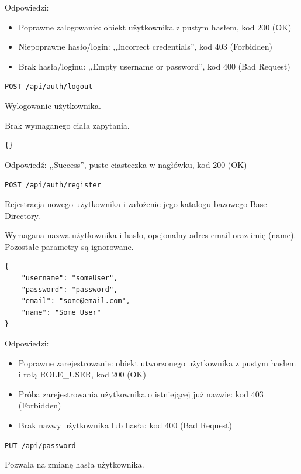 \documentclass[a4paper,twoside,12pt]{book}
\begin{document}
Odpowiedzi: 
\begin{itemize}
	\item Poprawne zalogowanie: obiekt użytkownika z pustym hasłem, kod 200 (OK) 
	\item Niepoprawne hasło/login: ,,Incorrect credentials'', kod 403 (Forbidden) 
	\item Brak hasła/loginu: ,,Empty username or password'', kod 400 (Bad Request) 
\end{itemize}


\texttt{POST\ /api/auth/logout}



Wylogowanie użytkownika.

Brak wymaganego ciała zapytania.

\begin{verbatim}
{}
\end{verbatim}

Odpowiedź: ,,Success'', puste ciasteczka w nagłówku, kod 200 (OK)

\label{register}

\texttt{POST\ /api/auth/register}

Rejestracja nowego użytkownika i założenie jego katalogu bazowego Base Directory.

Wymagana nazwa użytkownika i hasło, opcjonalny adres email oraz imię (name). Pozostałe parametry są ignorowane.

\begin{verbatim}
{
    "username": "someUser",
    "password": "password",
    "email": "some@email.com",
    "name": "Some User"
}
\end{verbatim}

Odpowiedzi: 
\begin{itemize}
	\item Poprawne zarejestrowanie: obiekt utworzonego użytkownika z pustym hasłem i rolą ROLE\_USER, kod 200 (OK) 
	\item Próba zarejestrowania użytkownika o istniejącej już nazwie: kod 403 (Forbidden) 
	\item Brak nazwy użytkownika lub hasła: kod 400 (Bad Request)
\end{itemize}

\label{change-password}

\texttt{PUT\ /api/password}

Pozwala na zmianę hasła użytkownika.
\end{document}
